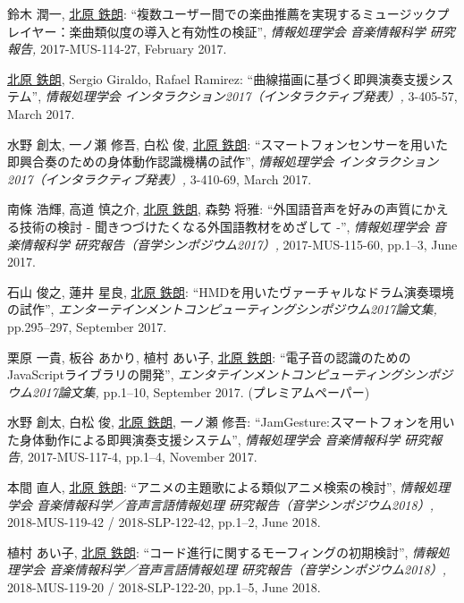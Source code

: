 \begin{Enumerate}
\item 
鈴木 潤一, 
\underline{北原 鉄朗}: 
    ``複数ユーザー間での楽曲推薦を実現するミュージックプレイヤー：楽曲類似度の導入と有効性の検証'', 
    {\it 情報処理学会 音楽情報科学 研究報告,
    } 2017-MUS-114-27, February 2017. 

\item 
\underline{北原 鉄朗}, 
Sergio Giraldo, 
Rafael Ramirez: 
    ``曲線描画に基づく即興演奏支援システム'', 
    {\it 情報処理学会 インタラクション2017（インタラクティブ発表）,
    } 3-405-57, March 2017. 

\item 
水野 創太, 
一ノ瀬 修吾, 
白松 俊, 
\underline{北原 鉄朗}: 
    ``スマートフォンセンサーを用いた即興合奏のための身体動作認識機構の試作'', 
    {\it 情報処理学会 インタラクション2017（インタラクティブ発表）,
    } 3-410-69, March 2017. 

\item 
南條 浩輝, 
高道 慎之介, 
\underline{北原 鉄朗}, 
森勢 将雅: 
    ``外国語音声を好みの声質にかえる技術の検討 - 聞きつづけたくなる外国語教材をめざして -'', 
    {\it 情報処理学会 音楽情報科学 研究報告（音学シンポジウム2017）,
    } 2017-MUS-115-60, pp.1--3, June 2017. 

\item 
石山 俊之, 
蓮井 星良, 
\underline{北原 鉄朗}: 
    ``HMDを用いたヴァーチャルなドラム演奏環境の試作'', 
    {\it エンターテインメントコンピューティングシンポジウム2017論文集,
    } pp.295--297, September 2017. 

\item 
栗原 一貴, 
板谷 あかり, 
植村 あい子, 
\underline{北原 鉄朗}: 
    ``電子音の認識のためのJavaScriptライブラリの開発'', 
    {\it エンタテインメントコンピューティングシンポジウム2017論文集,
    } pp.1--10, September 2017. 
(プレミアムペーパー)
\item 
水野 創太, 
白松 俊, 
\underline{北原 鉄朗}, 
一ノ瀬 修吾: 
    ``JamGesture:スマートフォンを用いた身体動作による即興演奏支援システム'', 
    {\it 情報処理学会 音楽情報科学 研究報告,
    } 2017-MUS-117-4, pp.1--4, November 2017. 

\item 
本間 直人, 
\underline{北原 鉄朗}: 
    ``アニメの主題歌による類似アニメ検索の検討'', 
    {\it  情報処理学会 音楽情報科学／音声言語情報処理 研究報告（音学シンポジウム2018）,
    } 2018-MUS-119-42 / 2018-SLP-122-42, pp.1--2, June 2018. 

\item 
植村 あい子, 
\underline{北原 鉄朗}: 
    ``コード進行に関するモーフィングの初期検討'', 
    {\it  情報処理学会 音楽情報科学／音声言語情報処理 研究報告（音学シンポジウム2018）,
    } 2018-MUS-119-20 / 2018-SLP-122-20, pp.1--5, June 2018. 


\end{Enumerate}
